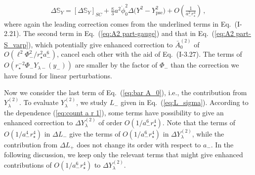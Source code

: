 \documentclass[a4paper,showpacs,preprintnumbers,amsmath,amssymb]{revtex4}
\begin{document}
\begin{eqnarray}
\Delta {\mathbb{S}}_Y = [\Delta {\mathbb{S}}_Y ]_{SC} 
   + \frac{\kappa}{3}a^2\dot\phi_0^2 \Delta 
    \bigl(Y^2 - Y^2_{ {\mathrm{pse}}} \bigr)  
  + O\left(\frac{1}{a_-^2 r_\star ^4}\right) \,,
\end{eqnarray}
where again the leading correction comes from the underlined terms in Eq.~(I-2.21). 
The second term in Eq.~(\ref{eq:A2 part-gauge}) and that in 
Eq.~(\ref{eq:A2 part-S_varp}), which potentially give enhanced correction to $\bar A^{(2)}_0$ of 
$O(\ell^2 \Phi_-^2/r_{\star}^2 a_-^6)$, cancel each other with the aid of Eq.~(I-3.27).  
The terms of $
O \left(r_\star^{-2}\Phi_- Y_{ \lambda -}(y_-)  \right)$ are smaller by the factor of $\Phi_-$ than the correction we have found for linear perturbations. 


Now we consider the last term of Eq.~(\ref{eq:bar A_0}), i.e., the contribution  from $Y^{(2)}_{ \lambda }$.
To evaluate $Y^{(2)}_{ \lambda }$, we study $L_-$ given in Eq.~(\ref{eq:L_sigma}). 
According to the dependence (\ref{eq:count a r 1}), some terms have possibility to give an enhanced correction to $\Delta
Y_{ \lambda }^{(2)}$ of order $O(1/a_-^6 r^4_\star)$. 
Note that the terms of $O(1/a_-^4 r^4_\star)$ in $\Delta L_-$ give the terms of $O(1/a_-^6 r^4_\star)$ in $\Delta
Y_{ \lambda }^{(2)}$, while the contribution from $\Delta L_+$ does not change its order with respect to $a_-$. 
In the following discussion, we keep only the relevant terms that might give enhanced contributions of $O(1/a_-^6 r^4_\star)$ to $\Delta
Y_{ \lambda }^{(2)}$. 
\end{document}
